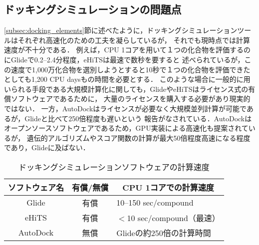 
\subsection{ドッキングシミュレーションの問題点}\label{subsec:docking_problem}
\ref{subsec:docking_elements}節に述べたように，ドッキングシミュレーションツールはそれぞれ高速化のための工夫を凝らしているが，
それでも現時点では計算速度が不十分である．
例えば，CPU 1コアを用いて１つの化合物を評価するのにGlideで0.2--2.4分程度\cite{Friesner2004}，eHiTSは最速で数秒\cite{Zsoldos2007}を要すると
述べられているが，この速度で1,000万化合物を選別しようとすると10秒で１つの化合物を評価できたとしても1,200 CPU daysもの時間を必要とする．
このような場合に一般的に用いられる手段である大規模計算化に関しても，GlideやeHiTSはライセンス式の有償ソフトウェアであるために，
大量のライセンスを購入する必要があり現実的ではない．
一方，AutoDockはライセンスが必要なく大規模並列計算が可能であるが，Glideと比べて250倍程度も遅いという
報告がなされている\cite{Tuccinardi2010}．AutoDockはオープンソースソフトウェアであるため，GPU実装による高速化も提案されているが，
遺伝的アルゴリズムやスコア関数の計算が最大50倍程度高速になる程度であり\cite{Kannan2010}，Glideに及ばない．

\begin{table}[htb] \centering
	\caption{ドッキングシミュレーションソフトウェアの計算速度}
	\label{table:docking_tools}
	\begin{tabular}{c|cl}
	\hline
	ソフトウェア名					&有償/無償				&\multicolumn{1}{c}{CPU 1コアでの計算速度} 					\\ \hline
	Glide							&有償						&10--150 sec/compound\cite{Friesner2004}				\\
	eHiTS							&有償						&$<$10 sec/compound（最速）\cite{Zsoldos2007}			\\
	AutoDock					&無償						&Glideの約250倍の計算時間\cite{Tuccinardi2010}		\\ \hline
	\end{tabular}
\end{table}

